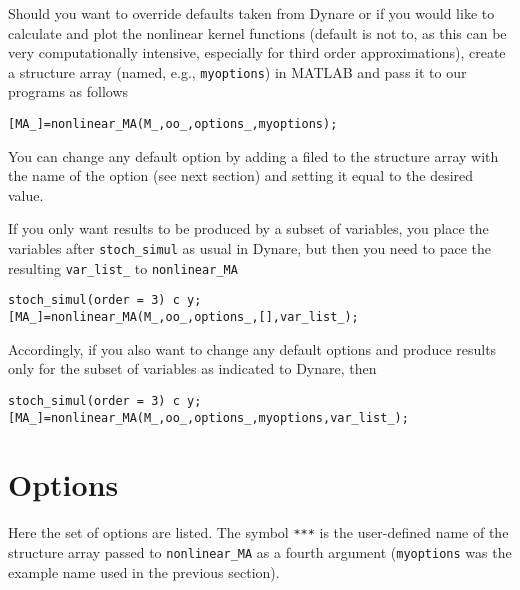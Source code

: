 \documentclass[12pt,leqno,subeqn,aer,aertt,harvard,ulem]{article}
\begin{document}
Should you want to override defaults taken from Dynare or if you would like to calculate and plot the nonlinear kernel functions (default is not to, as this can be very computationally intensive, especially for third order approximations), create a structure array (named, e.g., \verb+myoptions+) in MATLAB and pass it to our programs as follows
\begin{verbatim}
[MA_]=nonlinear_MA(M_,oo_,options_,myoptions);
\end{verbatim}
You can change any default option by adding a filed to the structure array with the name of the option (see next section) and setting it equal to the desired value.

If you only want results to be produced  by a subset of variables, you place the variables after \verb+stoch_simul+ as usual in Dynare, but then you need to pace the resulting \verb+var_list_+ to \verb+nonlinear_MA+
\begin{verbatim}
stoch_simul(order = 3) c y;
[MA_]=nonlinear_MA(M_,oo_,options_,[],var_list_);
\end{verbatim}
Accordingly, if you also want to change any default options and produce results only for the subset of variables as indicated to Dynare, then
\begin{verbatim}
stoch_simul(order = 3) c y;
[MA_]=nonlinear_MA(M_,oo_,options_,myoptions,var_list_);
\end{verbatim}

\section{Options}

Here the set of options are listed. The symbol \verb+***+ is the user-defined name of the structure array passed to \verb+nonlinear_MA+ as a fourth argument (\verb+myoptions+ was the example name used in the previous section).
\end{document}
